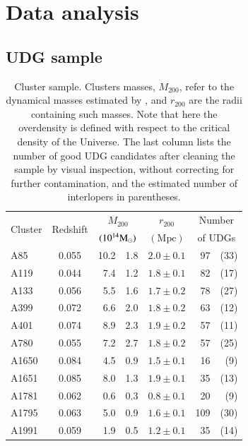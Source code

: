 \documentclass[usenatbib,fleqn]{mnras}
\begin{document}
\section{Data analysis}
\label{s:data}


\subsection{UDG sample}

\begin{table}
 \centering
\caption{Cluster sample. Clusters masses, $M_{200}$, refer to the dynamical masses estimated by \citet{sifon15_cccp}, and $r_{200}$ are the radii containing such masses. Note that here the overdensity is defined with respect to the critical density of the Universe. The last column lists the number of good UDG candidates after cleaning the sample by visual inspection, without correcting for further contamination, and the estimated number of interlopers in parentheses.}
\label{t:clusters}
\begin{tabular}{l c r@{ $\pm$ }l c r@{ }r}
\hline\hline
 \multirow{2}{*}{Cluster} & \multirow{2}{*}{Redshift} & \multicolumn{2}{c}{$M_{200}$} & $r_{200}$ & \multicolumn{2}{c}{Number} \\
         &          & \multicolumn{2}{c}{$(10^{14}\mathrm{M}_\odot)$} & $(\mathrm{Mpc})$ & \multicolumn{2}{c}{of UDGs}  \\[0.5ex]
\hline
%
A85        & 0.055 & 10.2 & 1.8 & $2.0\pm0.1$ &  97 & (33) \\
A119       & 0.044 &  7.4 & 1.2 & $1.8\pm0.1$ &  82 & (17) \\
A133       & 0.056 &  5.5 & 1.6 & $1.7\pm0.2$ &  78 & (27) \\
A399       & 0.072 &  6.6 & 2.0 & $1.8\pm0.2$ &  63 & (12) \\
A401       & 0.074 &  8.9 & 2.3 & $1.9\pm0.2$ &  57 & (11) \\
A780       & 0.055 &  7.2 & 2.7 & $1.8\pm0.2$ &  57 & (25) \\
A1650      & 0.084 &  4.5 & 0.9 & $1.5\pm0.1$ &  16 &  (9) \\
A1651      & 0.085 &  8.0 & 1.3 & $1.9\pm0.1$ &  35 & (13) \\
A1781      & 0.062 &  0.6 & 0.3 & $0.8\pm0.1$ &  20 &  (9) \\
A1795      & 0.063 &  5.0 & 0.9 & $1.6\pm0.1$ & 109 & (30) \\
A1991      & 0.059 &  1.9 & 0.5 & $1.2\pm0.1$ &  35 & (14) \\

\end{tabular}
\end{table}
\end{document}
